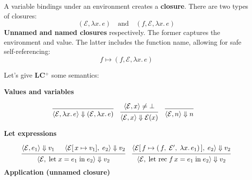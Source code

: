 \begin{Def}

    A variable bindings under an environment creates a \textbf{closure}. There are two types of closures:
    \[
        (\mathcal{E}, \lambda x.\,e) \quad \text{and} \quad (f,\mathcal{E}, \lambda x.\,e)
    \]
    \textbf{Unnamed and named closures} respectively. The former captures the environment and value. The 
    latter includes the function name, allowing for safe self-referencing:
    \[
        f\mapsto (f,\mathcal{E}, \lambda x.\,e)
    \]
\end{Def}
\newpage 

\noindent
Let's give \textbf{LC$^+$} some semantics:
\begin{Def}[LC$^+$ Semantics]

    \textbf{Values and variables}

\[
\begin{matrix}
\begin{prooftree}
  \infer0{
    \langle\mathcal{E}, \lambda x.\,e\rangle \Downarrow (\mathcal{E}, \lambda x.\,e)
  }
\end{prooftree}
&
\begin{prooftree}
    \hypo{\langle\mathcal{E}, x\rangle \neq \bot}
  \infer1{
    \langle\mathcal{E}, x\rangle \Downarrow \mathcal{E}(x)
  }
\end{prooftree}
&
\begin{prooftree}
  \infer0{
    \langle\mathcal{E}, n\rangle \Downarrow n
  }
\end{prooftree}
&
\end{matrix}
\]


\noindent
\textbf{Let expressions}

\[
\begin{matrix}
\begin{prooftree}
  \hypo{\langle\mathcal{E}, e_{1}\rangle \Downarrow v_{1}}
  \hypo{\langle\mathcal{E}[\,x \mapsto v_{1}],\; e_{2}\rangle \Downarrow v_2}
  \infer2{
    \langle\mathcal{E},\; \text{let}\; x = e_{1}\; \text{in}\; e_{2}\rangle \Downarrow v_2
  }
\end{prooftree}
&
\begin{prooftree}
  \hypo{\langle\mathcal{E}[\,f \mapsto (\,f,\;\mathcal{E}',\;\lambda x.\,e_1)\,],\; e_{2}\rangle \Downarrow v_2}
  \infer1{
    \langle\mathcal{E},\; \text{let rec}\; f\,x = e_{1}\; \text{in}\; e_{2}\rangle \Downarrow v_2
  }
\end{prooftree}
\end{matrix}
\]
\noindent
\textbf{Application (unnamed closure)}


\end{Def}
